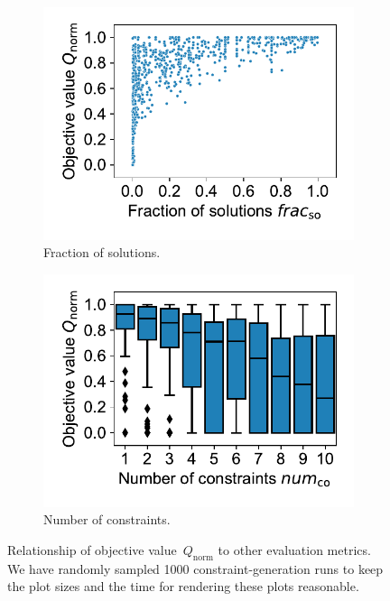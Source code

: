 \begin{figure}[t]
	\\
	\begin{subfigure}{0.48\textwidth}
		\centering
		\includegraphics[width=\textwidth, trim=15 15 15 10, clip]{plots/syn-solutions-vs-objective.pdf}
		\caption{Fraction of solutions.}
		\label{fig:syn:solutions-vs-objective}
	\end{subfigure}
	\hfill
	\begin{subfigure}{0.48\textwidth}
		\centering
		\includegraphics[width=\textwidth, trim=15 15 15 10, clip]{plots/syn-constraints-vs-objective.pdf}
		\caption{Number of constraints.}
		\label{fig:syn:constraints-vs-objective}
	\end{subfigure}
	\caption{
		Relationship of objective value~$Q_{\text{norm}}$ to other evaluation metrics.
		We have randomly sampled 1000 constraint-generation runs to keep the plot sizes and the time for rendering these plots reasonable.
	}
	\label{fig:syn:metrics-vs-metrics}
\end{figure}

